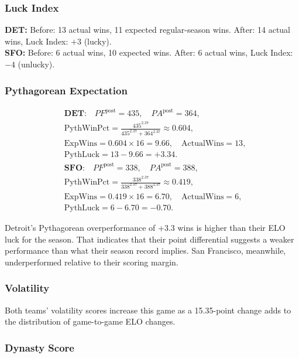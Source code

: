 \documentclass[a4paper,10.5pt,twoside]{article}
\begin{document}
\subsubsection{Luck Index}

\textbf{DET:} Before: 13 actual wins, 11 expected regular-season wins. After: 14 actual wins, Luck Index: $+3$ (lucky).\\

\textbf{SFO:} Before: 6 actual wins, 10 expected wins. After: 6 actual wins, Luck Index: $-4$ (unlucky).

\subsubsection{Pythagorean Expectation}

\[
\begin{aligned}
&\textbf{DET:}\quad PF^{\text{post}} = 435,\quad PA^{\text{post}} = 364,\\
&\text{PythWinPct}
   = \frac{435^{2.37}}{435^{2.37} + 364^{2.37}}
   \approx 0.604,\\
&\text{ExpWins} = 0.604 \times 16 = 9.66,\quad
\text{ActualWins} = 13,\\
&\text{PythLuck} = 13 - 9.66 = +3.34.\\[10pt]
&\textbf{SFO:}\quad PF^{\text{post}} = 338,\quad PA^{\text{post}} = 388,\\
&\text{PythWinPct}
   = \frac{338^{2.37}}{338^{2.37} + 388^{2.37}}
   \approx 0.419,\\
&\text{ExpWins} = 0.419 \times 16 = 6.70,\quad
\text{ActualWins} = 6,\\
&\text{PythLuck} = 6 - 6.70 = -0.70. 
\end{aligned}
\]

Detroit's Pythagorean overperformance of +3.3 wins is higher than their ELO luck for the season. That indicates that their point differential suggests a weaker performance than what their season record implies. San Francisco, meanwhile, underperformed relative to their scoring margin.

\subsubsection{Volatility}

Both teams' volatility scores increase this game as a 15.35-point change adds to the distribution of game-to-game ELO changes.

\subsubsection{Dynasty Score}
\end{document}

